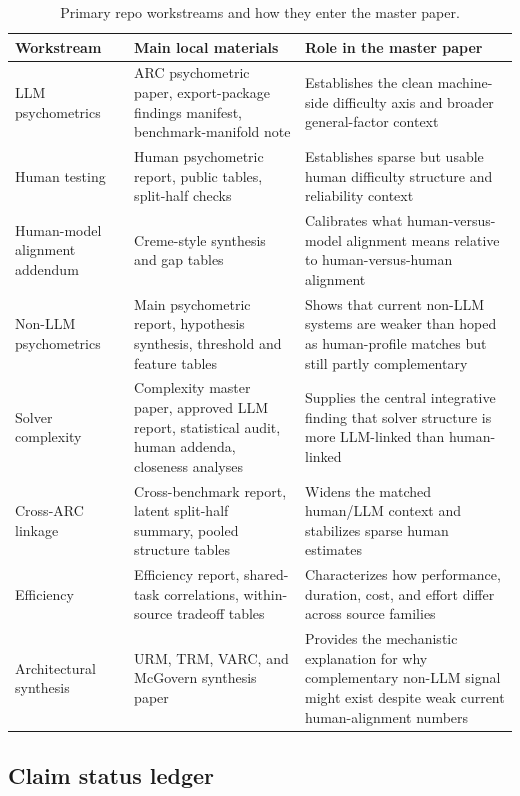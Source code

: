 \begin{table}[t]
\centering
\small
\caption{Primary repo workstreams and how they enter the master paper.}
\begin{tabular}{p{1.5in}p{1.9in}p{2.4in}}
\toprule
\textbf{Workstream} & \textbf{Main local materials} & \textbf{Role in the master paper} \\
\midrule
LLM psychometrics & ARC psychometric paper, export-package findings manifest, benchmark-manifold note & Establishes the clean machine-side difficulty axis and broader general-factor context \\
Human testing & Human psychometric report, public tables, split-half checks & Establishes sparse but usable human difficulty structure and reliability context \\
Human-model alignment addendum & Creme-style synthesis and gap tables & Calibrates what human-versus-model alignment means relative to human-versus-human alignment \\
Non-LLM psychometrics & Main psychometric report, hypothesis synthesis, threshold and feature tables & Shows that current non-LLM systems are weaker than hoped as human-profile matches but still partly complementary \\
Solver complexity & Complexity master paper, approved LLM report, statistical audit, human addenda, closeness analyses & Supplies the central integrative finding that solver structure is more LLM-linked than human-linked \\
Cross-ARC linkage & Cross-benchmark report, latent split-half summary, pooled structure tables & Widens the matched human/LLM context and stabilizes sparse human estimates \\
Efficiency & Efficiency report, shared-task correlations, within-source tradeoff tables & Characterizes how performance, duration, cost, and effort differ across source families \\
Architectural synthesis & URM, TRM, VARC, and McGovern synthesis paper & Provides the mechanistic explanation for why complementary non-LLM signal might exist despite weak current human-alignment numbers \\
\bottomrule
\end{tabular}
\end{table}

\subsection{Claim status ledger}

